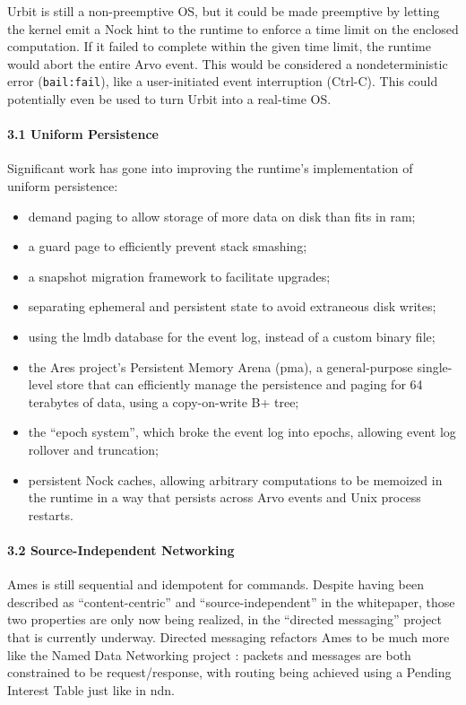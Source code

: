 \documentclass[twoside]{article}
\begin{document}
Urbit is still a non-preemptive OS, but it could be made preemptive by letting the kernel emit a Nock hint to the runtime to enforce a time limit on the enclosed computation.  If it failed to complete within the given time limit, the runtime would abort the entire Arvo event.  This would be considered a nondeterministic error (\lstinline[style=inlinecode]{bail:fail}), like a user-initiated event interruption (Ctrl-C).  This could potentially even be used to turn Urbit into a real-time OS.

\paragraph{3.1 Uniform Persistence}

Significant work has gone into improving the runtime's implementation of uniform persistence:
\begin{itemize}
  \item  demand paging to allow storage of more data on disk than fits in {\sc ram};
  \item  a guard page to efficiently prevent stack smashing;
  \item  a snapshot migration framework to facilitate upgrades;
  \item  separating ephemeral and persistent state to avoid extraneous disk writes;
  \item  using the {\sc lmdb} database for the event log, instead of a custom binary file;
  \item  the Ares project's Persistent Memory Arena ({\sc pma}), a general-purpose single-level store that can efficiently manage the persistence and paging for 64 terabytes of data, using a copy-on-write B+ tree;
  \item  the ``epoch system'', which broke the event log into epochs, allowing event log rollover and truncation;
  \item  persistent Nock caches, allowing arbitrary computations to be memoized in the runtime in a way that persists across Arvo events and Unix process restarts.
\end{itemize}

\paragraph{3.2 Source-Independent Networking}

Ames is still sequential and idempotent for commands.  Despite having been described as ``content-centric'' and ``source-independent'' in the whitepaper, those two properties are only now being realized, in the ``directed messaging'' project that is currently underway.  Directed messaging refactors Ames to be much more like the Named Data Networking project \citep{Zhang2014}: packets and messages are both constrained to be request/response, with routing being achieved using a Pending Interest Table just like in {\sc ndn}.
\end{document}
